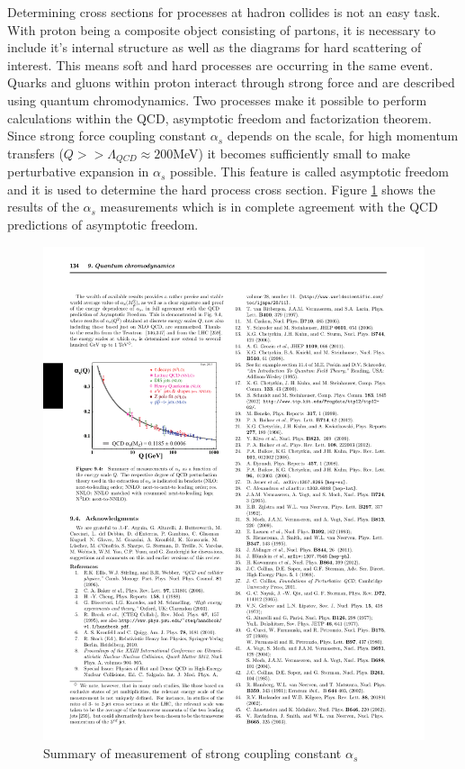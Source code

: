 	Determining cross sections for processes at hadron collides is not an easy task. With proton being a composite object consisting of partons, it is necessary to include it's internal structure as well as the diagrams for hard scattering of interest. This means soft and hard processes are occurring in the same event. Quarks and gluons within proton interact through strong force and are described using quantum chromodynamics. Two processes make it possible to perform calculations within the QCD, asymptotic freedom and factorization theorem. Since strong force coupling constant $\alpha_s$ depends on the scale, for high momentum transfers ($Q >> \Lambda_{QCD}\approx 200$MeV) it becomes sufficiently small to make perturbative expansion in $\alpha_s$ possible. This feature is called asymptotic freedom and it is used to determine the hard process cross section. Figure \ref{fig:alpha_s} shows the results of the $\alpha_s$ measurements which is in complete agreement with the QCD predictions of asymptotic freedom. \\
\begin{figure}[htbp]
	\centering
		\includegraphics{Figures/alpha_s.pdf}
	\caption[Strong force coupling constant]{Summary of measurement of strong coupling constant $\alpha_s$ \cite{Agashe:2014kda} }
	\label{fig:alpha_s}
\end{figure}

